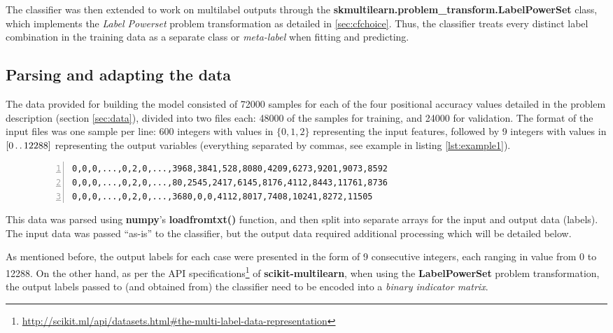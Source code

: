 \documentclass{kthreport}
\theoremstyle{definition}
\newcommand{\twodots}{\mathinner {\ldotp \ldotp}}
\begin{document}
The classifier was then extended to work on multilabel outputs through the \textbf{skmultilearn.problem\_transform.LabelPowerSet} class, which implements the \emph{Label Powerset} problem transformation as detailed in \ref{sec:cfchoice}. 
Thus, the classifier treats every distinct label combination in the training data as a separate class or \emph{meta-label} when fitting and predicting.

\subsection{Parsing and adapting the data}\label{sec:parsing}

The data provided for building the model consisted of \num{72000} samples for each of the four positional accuracy values detailed in the problem description (section \ref{sec:data}), divided into two files each: \num{48000} of the samples for training, and \num{24 000} for validation. The format of the input files was one sample per line: \num{600} integers with values in $\{0, 1, 2\}$ representing the input features, followed by \num{9} integers with values in $[0 \twodots 12288]$ representing the output variables (everything separated by commas, see example in listing \ref{lst:example1}).

\begin{figure}[tb]
\begin{lstlisting}[captionpos=b,
basicstyle={\small\ttfamily},
numbers=left, 
numberstyle=\tiny\color{gray},
caption={Abbreviated example of input samples.},
label={lst:example1}]
0,0,0,...,0,2,0,...,3968,3841,528,8080,4209,6273,9201,9073,8592
0,0,0,...,0,2,0,...,80,2545,2417,6145,8176,4112,8443,11761,8736
0,0,0,...,0,2,0,...,3680,0,0,4112,8017,7408,10241,8272,11505
\end{lstlisting}
\end{figure}


This data was parsed using \textbf{numpy}'s \textbf{loadfromtxt()} function, and then split into separate arrays for the input and output data (labels). The input data was passed ``as-is'' to the classifier, but the output data required additional processing which will be detailed below.

As mentioned before, the output labels for each case were presented in the form of \num{9} consecutive integers, each ranging in value from \num{0} to \num{12288}. On the other hand, as per the API specifications\footnote{\url{http://scikit.ml/api/datasets.html#the-multi-label-data-representation}} of \textbf{scikit-multilearn}, when using the \textbf{LabelPowerSet} problem transformation, the output labels passed to (and obtained from) the classifier need to be encoded into a \emph{binary indicator matrix}. 
\end{document}
